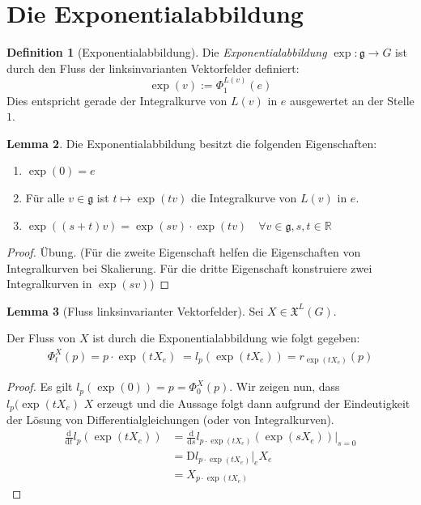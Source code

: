 \documentclass[a4paper]{scrbook}
\numberwithin{equation}{chapter}
\newcommand{\D}{\mathrm{d}}
\newcommand{\DD}{\mathrm{D}}
\newcommand{\R}{\mathbb{R}}
\newcommand{\vf}{\mathfrak{X}}
\theoremstyle{definition}
\newtheorem{defn}{Definition}[section]
\newtheorem{lemma}[defn]{Lemma}
\begin{document}
	\section{Die Exponentialabbildung}
		\begin{defn}[Exponentialabbildung]
			Die \emph{Exponentialabbildung} $\exp\colon\mathfrak{g}\rightarrow G$ ist durch den Fluss der linksinvarianten Vektorfelder definiert:
			\begin{equation*}
				\exp(v):=\Phi_1^{L(v)}(e)
			\end{equation*}
			Dies entspricht gerade der Integralkurve von $L(v)$ in $e$ ausgewertet an der Stelle $1$.
		\end{defn}
		\begin{lemma}\label{lemma:Eigenschaften_exp}
			Die Exponentialabbildung besitzt die folgenden Eigenschaften:
			\begin{enumerate}[label=(\roman*)]
				\item $\exp(0)=e$
				\item Für alle $v \in \mathfrak g$ ist $t \mapsto \exp(tv)$ die Integralkurve von $L(v)$ in $e$.
				\item $\exp((s+t)v)=\exp(sv)\cdot\exp(tv) \quad\forall v\in\mathfrak{g}, s,t\in \R$
			\end{enumerate}
			\begin{proof}
				Übung. (Für die zweite Eigenschaft helfen die Eigenschaften von Integralkurven bei Skalierung. Für die dritte Eigenschaft konstruiere zwei Integralkurven in $\exp(sv)$)
			\end{proof}
		\end{lemma}
		\begin{lemma}[Fluss linksinvarianter Vektorfelder]\label{lemma:Fluss_linksinvarianter_Vektorfelder}
			Sei $X\in\vf^L(G)$.
			
			Der Fluss von $X$ ist durch die Exponentialabbildung wie folgt gegeben:
			\begin{align*}
				\Phi^X_t(p)=p\cdot \exp(tX_e) \; =l_p(\exp(tX_e))=r_{\exp(tX_e)}(p)
			\end{align*}
			\begin{proof}
				Es gilt $l_p(\exp(0))=p=\Phi^X_0(p)$. Wir zeigen nun, dass $l_p(\exp(tX_e)$ $X$ erzeugt und die Aussage folgt dann aufgrund der Eindeutigkeit der Lösung von Differentialgleichungen (oder von Integralkurven).
				\begin{align*}
					\frac{\D}{\D t} l_p(\exp(tX_e))&=\frac{\D}{\D s} l_{p\cdot\exp(tX_e)}(\exp(sX_e))\Big\vert_{s=0}\\
					&=\DD l_{p\cdot\exp(tX_e)}\vert_eX_e\\
					&=X_{p\cdot\exp(tX_e)}
				\end{align*}
			\end{proof}
		\end{lemma}
\end{document}
